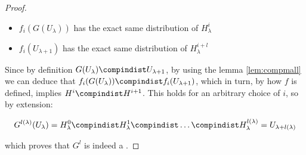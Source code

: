 \begin{proof}
    \begin{itemize}
        \item $f_i(G(U_\lambda))$ has the exact same distribution of $H_\lambda^i$
        \item $f_i(U_{\lambda + 1})$ has the exact same distribution of $H_\lambda^{i + l}$
    \end{itemize}

    Since by \prg{} definition $G(U_\lambda) \compindist U_{\lambda + 1}$, by using the lemma \ref{lem:compmall} we can deduce that $f_i(G(U_\lambda)) \compindist f_{i}(U_{\lambda + 1})$, which in turn, by how $f$ is defined, implies $H^{i} \compindist H^{i + 1}$. This holds for an arbitrary choice of $i$, so by extension:

    \begin{equation*}
        G^{l(\lambda)}(U_\lambda) = H_{\lambda}^{0} \compindist H_{\lambda}^{1} \compindist \dots \compindist H_{\lambda}^{{l(\lambda)}} = U_{\lambda + l(\lambda)}
    \end{equation*}

    which proves that $G^l$ is indeed a \prg.
\end{proof}

